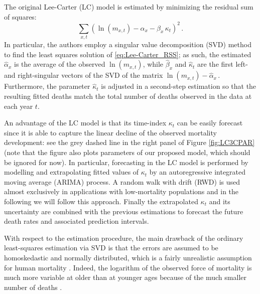 \documentclass[Thesis]{subfiles}
\begin{document}
The original Lee-Carter (LC) model is estimated by minimizing the residual sum of squares:
\begin{equation}\label{eq:Lee-Carter_RSS}
\sum_{x,t} \left( \ln (m_{x,t}) -\alpha_x - \beta_x \, \kappa_t \right)^2 \, .
\end{equation}
In particular, the authors employ a singular value decomposition (SVD) method to find the least squares solution of \eqref{eq:Lee-Carter_RSS}; as such, the estimated $\hat{\alpha}_x$ is the average of the observed $\ln (m_{x,t})$, while $\hat{\beta}_x$ and $\hat{\kappa}_t$ are the first left- and right-singular vectors of the SVD of the matrix $\ln (m_{x,t}) - \hat{\alpha}_x \,$. Furthermore, the parameter $\hat{\kappa}_t$ is adjusted in a second-step estimation so that the resulting fitted deaths match the total number of deaths observed in the data at each year $t$.

An advantage of the LC model is that its time-index $\kappa_{t}$ can be easily forecast since it is able to capture the linear decline of the observed mortality development: see the grey dashed line in the right panel of Figure \ref{fig:LC3CPAR} (note that the figure also plots parameters of our proposed model, which should be ignored for now). In particular, forecasting in the LC model is performed by modelling and extrapolating fitted values of $\kappa_{t}$ by an autoregressive integrated moving average (ARIMA) process. A random walk with drift (RWD) is used almost exclusively in applications with low-mortality populations and in the following we will follow this approach. Finally the extrapolated $\kappa_{t}$ and its uncertainty are combined with the previous estimations to forecast the future death rates and associated prediction intervals.

With respect to the estimation procedure, the main drawback of the ordinary least-squares estimation via SVD is that the errors are assumed to be homoskedastic and normally distributed, which is a fairly unrealistic assumption for human mortality \citep{alho2000discussion}. Indeed, the logarithm of the observed force of mortality is much more variable at older than at younger ages because of the much smaller number of deaths \citep{brouhns2002poisson}. 
\end{document}
